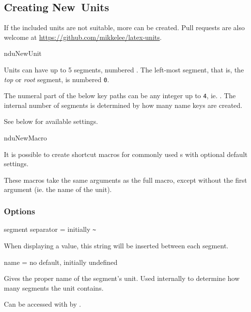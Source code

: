 \documentclass{article}
\begin{document}
\subsection{Creating New Units} %

\label{units:new}
If the included units are not suitable, more can be created. Pull requests are also welcome at \url{https://github.com/mikkelee/latex-units}.

\begin{docCommand}
	{nduNewUnit}
	{}
	
Units can have up to 5 segments, numbered . The left-most segment, that is, the \emph{top} or \emph{root} segment, is numbered \texttt{0}.

The numeral part of the below key paths  can be any integer up to \texttt{4}, ie. . The internal number of segments is determined by how many name keys are created.

See below for available settings.

\end{docCommand}

\begin{docCommand}
	{nduNewMacro}
	{}

	It is possible to create shortcut macros for commonly used s with optional default settings.

	These macros take the same arguments as the full  macro, except without the first argument (ie. the name of the unit).

\end{docCommand}

\clearpage
\subsubsection{Options}

\begin{docKey}
	{segment separator}
	{=}
	{initially \texttt{\~{}}}
	
	When displaying a value, this string will be inserted between each segment.
\end{docKey}

\begin{docKey}
	[segment 0]{name}
	{=}
	{no default, initially undefined}

	Gives the proper name of the segment's unit. Used internally to determine how many segments the unit contains.
	
	Can be accessed with by .
\end{docKey}
\end{document}
